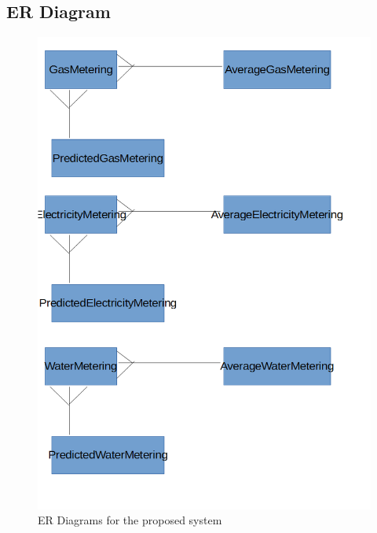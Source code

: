 \subsection{ER Diagram}
\begin{figure}[H]
    \includegraphics[width=\textwidth]{./ERDiagram.png}
    \caption{ER Diagrams for the proposed system} \label{fig:ER Diagrams}
\end{figure}
